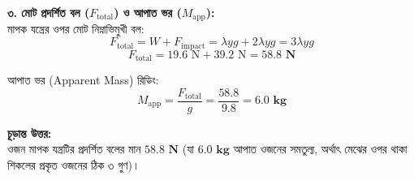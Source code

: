 \documentclass[12pt, a4paper]{article}
\begin{document}
\begin{tcolorbox}[solutionbox={সমাধান (Solution)}]
\begin{center}
\end{center}
\vspace{1em}

\noindent
\textbf{৩. মোট প্রদর্শিত বল ($F_{\text{total}}$) ও আপাত ভর ($M_{\text{app}}$):} \\
মাপক যন্ত্রের ওপর মোট নিম্নাভিমুখী বল:
$$F_{\text{total}} = W + F_{\text{impact}} = \lambda yg + 2\lambda yg = 3\lambda yg$$ 
$$F_{\text{total}} = 19.6\text{ N} + 39.2\text{ N} = \mathbf{58.8\text{ N}}$$

\noindent
আপাত ভর (Apparent Mass) রিডিং:
$$M_{\text{app}} = \frac{F_{\text{total}}}{g} = \frac{58.8}{9.8} = \mathbf{6.0\text{ kg}}$$

\vspace{1em}
\begin{tcolorbox}[answerbox]
\textbf{চূড়ান্ত উত্তর:} \\
ওজন মাপক যন্ত্রটির প্রদর্শিত বলের মান $\mathbf{58.8\text{ N}}$ (যা $\mathbf{6.0\text{ kg}}$ আপাত ওজনের সমতুল্য, অর্থাৎ মেঝের ওপর থাকা শিকলের প্রকৃত ওজনের ঠিক ৩ গুণ)।
\end{tcolorbox}
\end{tcolorbox}
\end{document}
